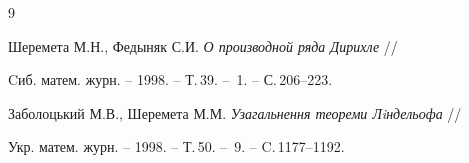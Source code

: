 \begin{thebibliography}{9}







Шеремета М.Н., Федыняк С.И. {\em О производной ряда Дирихле} // 


Cиб. матем. журн. -- 1998. -- Т.\,39. -- \No\,1. -- С.\,206--223.




Заболоцький М.В., Шеремета М.М. {\em Узагальнення теореми Лiндельофа} //


Укр. матем. журн. -- 1998. -- Т.\,50. -- \No\,9. -- C.\,1177--1192.





\end{thebibliography}





\vskip 2cm












\label{end}











